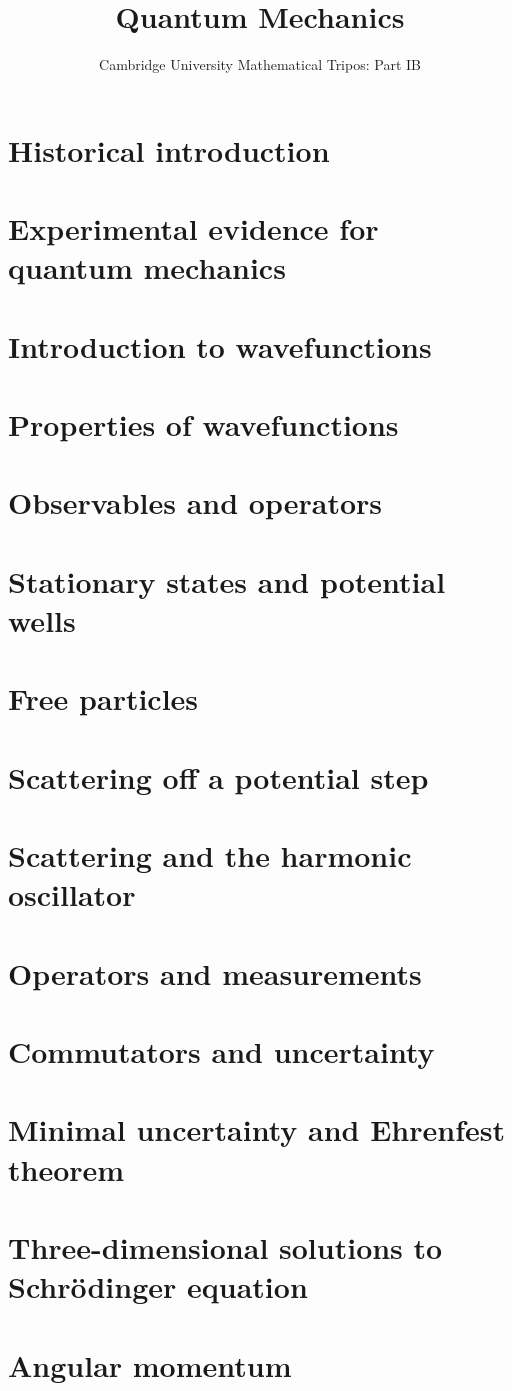 \documentclass{article}
\title{Quantum Mechanics}
\author{Cambridge University Mathematical Tripos: Part IB}
\begin{document}
\maketitle

\tableofcontentsnewpage{}

\section{Historical introduction}

\section{Experimental evidence for quantum mechanics}

\section{Introduction to wavefunctions}

\section{Properties of wavefunctions}

\section{Observables and operators}

\section{Stationary states and potential wells}

\section{Free particles}

\section{Scattering off a potential step}

\section{Scattering and the harmonic oscillator}

\section{Operators and measurements}

\section{Commutators and uncertainty}

\section{Minimal uncertainty and Ehrenfest theorem}

\section{Three-dimensional solutions to Schr\"odinger equation}

\section{Angular momentum}

\end{document}
